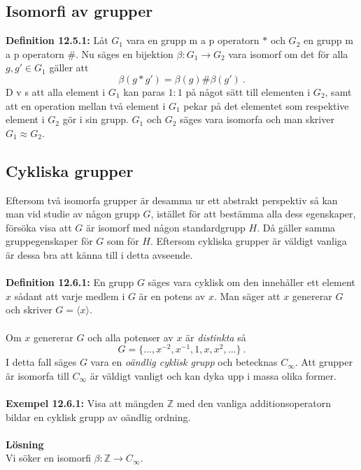 \documentclass{article}
\begin{document}
\subsection{Isomorfi av grupper}
\textbf{Definition 12.5.1:} Låt $G_1$ vara en grupp m a p operatorn $*$ och $G_2$ en grupp m a p operatorn $\#$. Nu säges en bijektion $\beta: G_1\rightarrow G_2$ vara isomorf om det för alla $g,g'\in G_1$ gäller att
$$
\beta(g*g')=\beta(g)\#\beta(g') \ .
$$
D v s att alla element i $G_1$ kan paras $1:1$ på något sätt till elementen i $G_2$, samt att en operation mellan två element i $G_1$ pekar på det elementet som respektive element i $G_2$ gör i sin grupp. $G_1$ och $G_2$ säges vara isomorfa och man skriver $G_1\approx G_2$.

\subsection{Cykliska grupper}
Eftersom två isomorfa grupper är desamma ur ett abstrakt perspektiv så kan man vid studie av någon grupp $G$, istället för att bestämma alla dess egenskaper, försöka visa att $G$ är isomorf med någon standardgrupp $H$. Då gäller samma gruppegenskaper för $G$ som för $H$. Eftersom cykliska grupper är väldigt vanliga är dessa bra att känna till i detta avseende.\\ \\ 
\textbf{Definition 12.6.1:} En grupp $G$ säges vara cyklisk om den innehåller ett element $x$ sådant att varje medlem i $G$ är en potens av $x$. Man säger att $x$ genererar $G$ och skriver $G=\langle x\rangle$.\\ \\ 
Om $x$ genererar $G$ och alla potenser av $x$ är \textit{distinkta} så
$$
G=\{...,x^{-2},x^{-1},1,x,x^2,...\} \ .
$$
I detta fall säges $G$ vara en \textit{oändlig cyklisk grupp} och betecknas $C_{\infty}$. Att grupper är isomorfa till $C_{\infty}$ är väldigt vanligt och kan dyka upp i massa olika former.\\ \\ 
\textbf{Exempel 12.6.1:} Visa att mängden $\mathbb{Z}$ med den vanliga additionsoperatorn bildar en cyklisk grupp av oändlig ordning.\\ \\ 
\textbf{Lösning}\\ 
Vi söker en isomorfi $\beta:\mathbb{Z}\rightarrow C_{\infty}$.
\end{document}
